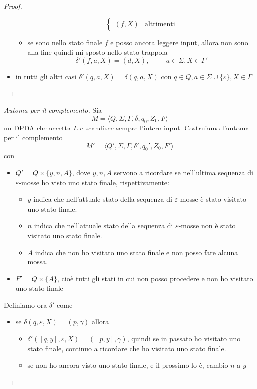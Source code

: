 \documentclass[12pt]{report}
\theoremstyle{definition}
\begin{document}
\begin{proof}
\begin{itemize}
\begin{itemize}
$$\begin{cases}
						(f, X) & \text{altrimenti}
					\end{cases}
					$$
				\item se sono nello stato finale $f$ e posso ancora leggere input, allora non sono alla fine quindi mi sposto nello stato trappola
					$$\delta'(f, a, X) = (d, X), \hspace{1cm}a \in \Sigma, X \in \Gamma'$$
			\end{itemize}
		\item in tutti gli altri casi $\delta'(q, a, X) = \delta(q, a, X)$ con $q \in Q, a \in \Sigma \cup \{\varepsilon\}, X \in \Gamma$
	\end{itemize}
\end{proof}

\begin{proof}[Automa per il complemento]
Sia 
$$ M = \langle Q, \Sigma, \Gamma, \delta, q_0, Z_0, F \rangle $$
un DPDA che accetta $L$ e scandisce sempre l'intero input.
Costruiamo l'automa per il complemento
$$ M' = \langle Q', \Sigma, \Gamma, \delta', q_0', Z_0, F' \rangle $$
con 
\begin{itemize}
	\item $Q' = Q \times \{y, n, A \}$, dove $y, n, A$ servono a ricordare se nell'ultima sequenza di $\varepsilon$-mosse ho visto uno stato finale, rispettivamente:
		\begin{itemize}
			\item $y$ indica che nell'attuale stato della sequenza di $\varepsilon$-mosse è stato visitato uno stato finale.
			\item $n$ indica che nell'attuale stato della sequenza di $\varepsilon$-mosse non è stato visitato uno stato finale.
			\item $A$ indica che non ho visitato uno stato finale e non posso fare alcuna mossa.
		\end{itemize}
	\item $F' = Q \times \{ A \}$, cioè tutti gli stati in cui non posso procedere e non ho visitato uno stato finale
\end{itemize}
Definiamo ora $\delta'$ come
\begin{itemize}
	\item se $\delta(q, \varepsilon, X) = (p, \gamma)$ allora 
		\begin{itemize}
			\item $\delta'([q, y], \varepsilon, X) = ([p, y], \gamma)$, quindi se in passato ho visitato uno stato finale, continuo a ricordare che ho visitato uno stato finale.
			\item se non ho ancora visto uno stato finale, e il prossimo lo è, cambio $n$ a $y$ 

\end{itemize}
\end{itemize}
\end{proof}
\end{document}
